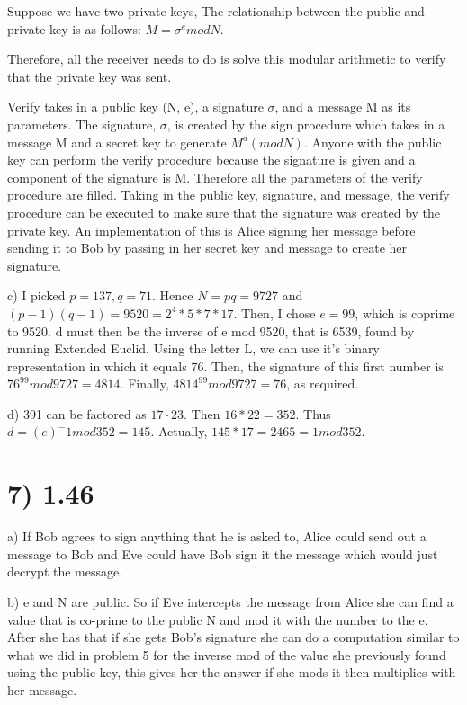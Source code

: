 \documentclass[a4paper]{article}
\begin{document}
Suppose we have two private keys, The relationship between the public and private key is as follows:
$M =  \sigma^{e} mod N$. 

Therefore, all the receiver needs to do is solve this modular arithmetic to verify that the private key was sent. 

Verify takes in a public key (N, e), a signature $\sigma$, and a message M as its parameters. The signature, $\sigma$, is created by the sign procedure which takes in a message M and a secret key to generate $M^{d}(mod N)$. Anyone with the public key can perform the verify procedure because the signature is given and a component of the signature is M. Therefore all the parameters of the verify procedure are filled. Taking in the public key, signature, and message, the verify procedure can be executed to make sure that the signature was created by the private key. An implementation of this is Alice signing her message before sending it to Bob by passing in her secret key and message to create her signature. 

c) I picked $p = 137, q = 71$. Hence $N = pq = 9727$ and $(p−1)(q −1) = 9520 = 2^4 * 5 * 7 * 17$. Then, I chose $e = 99$, which is coprime to 9520. d must then be the inverse of e mod 9520, that is 6539, found by running Extended Euclid. Using the letter L, we can use it's binary representation in which it equals 76. Then, the signature of this first number is $76^99 mod 9727 = 4814$. Finally, $4814^99 mod 9727 = 76$, as required.

d) 391 can be factored as $17 · 23$. Then $16 * 22 = 352$. Thus $d = (e)^−1 mod 352 = 145$. Actually, $145 * 17 = 2465 = 1 mod 352$.

\section*{7) 1.46}

a) If Bob agrees to sign anything that he is asked to, Alice could send out a message to Bob and Eve could have Bob sign it the message which would just decrypt the message.

b) e and N are public. So if Eve intercepts the message from Alice she can find a value that is co-prime to the public N and mod it with the number to the e. After she has that if she gets Bob's signature she can do a computation similar to what we did in problem 5 for the inverse mod of the value she previously found using the public key, this gives her the answer if she mods it then multiplies with her message.
\end{document}
